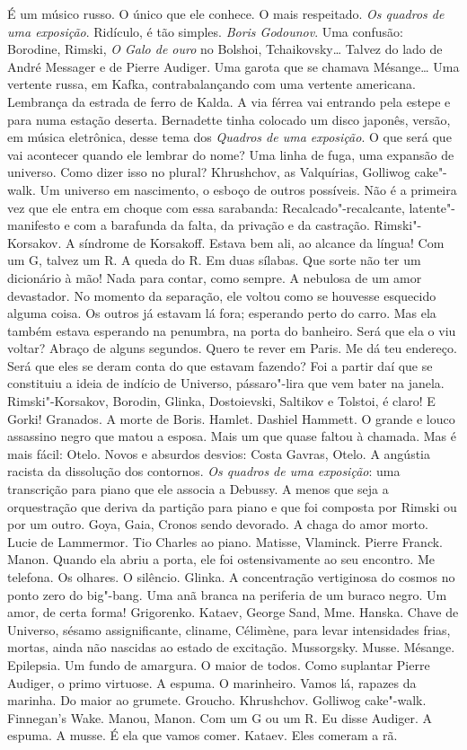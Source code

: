 É um músico russo. O único que ele conhece. O mais respeitado. \emph{Os
quadros de uma exposição}. Ridículo, é tão simples. \emph{Boris
Godounov}. Uma confusão: Borodine, Rimski, \emph{O Galo de ouro} no
Bolshoi, Tchaikovsky\ldots{} Talvez do lado de André Messager e de Pierre
Audiger. Uma garota que se chamava Mésange\ldots{} Uma vertente russa, em
Kafka, contrabalançando com uma vertente americana. Lembrança da estrada
de ferro de Kalda. A via férrea vai entrando pela estepe e para numa
estação deserta. Bernadette tinha colocado um disco japonês, versão, em
música eletrônica, desse tema dos \emph{Quadros de uma exposição}. O que
será que vai acontecer quando ele lembrar do nome? Uma linha de fuga,
uma expansão de universo. Como dizer isso no plural? Khrushchov, as
Valquírias, Golliwog cake"-walk. Um universo em nascimento, o esboço de
outros possíveis. Não é a primeira vez que ele entra em choque com essa
sarabanda: Recalcado"-recalcante, latente"-manifesto e com a barafunda da %
falta, da privação e da castração. Rimski"-Korsakov. A síndrome de
Korsakoff. Estava bem ali, ao alcance da língua! Com um G, talvez um R.
A queda do R. Em duas sílabas. Que sorte não ter um dicionário à mão!
Nada para contar, como sempre. A nebulosa de um amor devastador. No
momento da separação, ele voltou como se houvesse esquecido alguma
coisa. Os outros já estavam lá fora; esperando perto do carro. Mas ela
também estava esperando na penumbra, na porta do banheiro. Será que ela
o viu voltar? Abraço de alguns segundos. Quero te rever em Paris. Me dá
teu endereço. Será que eles se deram conta do que estavam fazendo? Foi a
partir daí que se constituiu a ideia de indício de Universo,
pássaro"-lira que vem bater na janela. Rimski"-Korsakov, Borodin,
Glinka, Dostoievski, Saltikov e Tolstoi, é claro! E Gorki! Granados. A
morte de Boris. Hamlet. Dashiel Hammett. O grande e louco assassino
negro que matou a esposa. Mais um que quase faltou à chamada. Mas é mais
fácil: Otelo. Novos e absurdos desvios: Costa Gavras, Otelo. A angústia
racista da dissolução dos contornos. \emph{Os quadros de uma exposição}:
uma transcrição para piano que ele associa a Debussy. A menos que seja a
orquestração que deriva da partição para piano e que foi composta por
Rimski ou por um outro. Goya, Gaia, Cronos sendo devorado. A chaga do
amor morto. Lucie de Lammermor. Tio Charles ao piano. Matisse, Vlaminck.
Pierre Franck. Manon. Quando ela abriu a porta, ele foi ostensivamente
ao seu encontro. Me telefona. Os olhares. O silêncio. Glinka. A
concentração vertiginosa do cosmos no ponto zero do big"-bang. Uma anã
branca na periferia de um buraco negro. Um amor, de certa forma!
Grigorenko. Kataev, George Sand, Mme. Hanska. Chave de Universo, sésamo %
assignificante, cliname, Célimène, para levar intensidades frias,
mortas, ainda não nascidas ao estado de excitação. Mussorgsky. Musse.
Mésange. Epilepsia. Um fundo de amargura. O maior de todos. Como
suplantar Pierre Audiger, o primo virtuose. A espuma. O marinheiro.
Vamos lá, rapazes da marinha. Do maior ao grumete. Groucho. Khrushchov.
Golliwog cake"-walk. Finnegan's Wake. Manou, Manon. Com um G ou um R. Eu
disse Audiger. A espuma. A musse. É ela que vamos comer. Kataev. Eles
comeram a rã.


